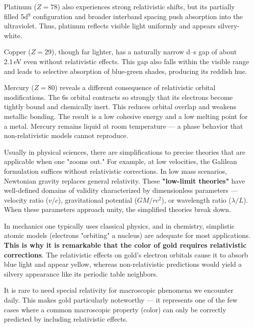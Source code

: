 Platinum ($Z = 78$) also experiences strong relativistic shifts, but its partially filled 5d$^9$ configuration and broader interband spacing push absorption into the ultraviolet. Thus, platinum reflects visible light uniformly and appears silvery-white.

Copper ($Z = 29$), though far lighter, has a naturally narrow d–s gap of about 2.1 eV even without relativistic effects. This gap also falls within the visible range and leads to selective absorption of blue-green shades, producing its reddish hue.

Mercury ($Z = 80$) reveals a different consequence of relativistic orbital modifications. The 6s orbital contracts so strongly that its electrons become tightly bound and chemically inert. This reduces orbital overlap and weakens metallic bonding. The result is a low cohesive energy and a low melting point for a metal. Mercury remains liquid at room temperature — a phase behavior that non-relativistic models cannot reproduce.

\begin{commentary}
  Usually in physical sciences, there are simplifications to precise theories that are applicable when one "zooms out." For example, at low velocities, the Galilean formulation suffices without relativistic corrections. In low mass scenarios, Newtonian gravity replaces general relativity. These \textbf{"low-limit theories"} have well-defined domains of validity characterized by dimensionless parameters — velocity ratio ($v/c$), gravitational potential ($GM/rc^2$), or wavelength ratio ($\lambda/L$). When these parameters approach unity, the simplified theories break down.
  
  In mechanics one typically uses classical physics, and in chemistry, simplistic atomic models (electrons "orbiting" a nucleus) are adequate for most applications. \textbf{This is why it is remarkable that the color of gold requires relativistic corrections}. The relativistic effects on gold's electron orbitals cause it to absorb blue light and appear yellow, whereas non-relativistic predictions would yield a silvery appearance like its periodic table neighbors.
  
  It is rare to need special relativity for macroscopic phenomena we encounter daily. This makes gold particularly noteworthy — it represents one of the few cases where a common macroscopic property (color) can only be correctly predicted by including relativistic effects.
\end{commentary}